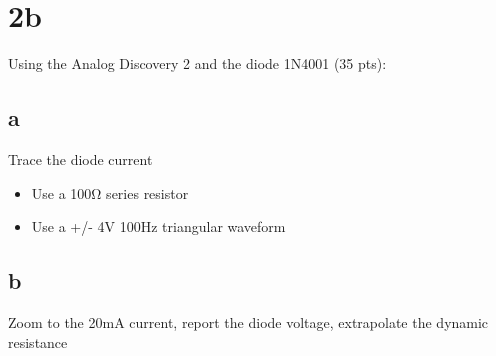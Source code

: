 \documentclass{article}
\begin{document}
	\section*{2b}
	
	Using the Analog Discovery 2 and the diode 1N4001 (35 pts):
	
	\subsection*{a}
	
	Trace the diode current
	
	\begin{itemize}
		\item Use a 100Ω series resistor
		\item Use a +/- 4V 100Hz triangular waveform
	\end{itemize}

	\subsection*{b}
	
	Zoom to the 20mA current, report the diode voltage, extrapolate the dynamic resistance
	
	
	
	
\end{document}
